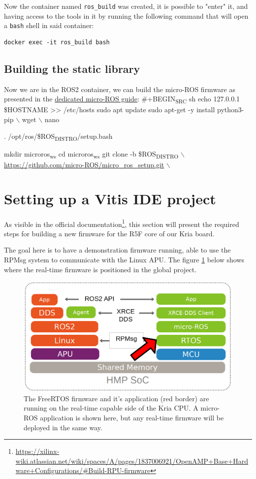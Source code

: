 \documentclass[10pt]{article}
\begin{document}
Now the container named \texttt{ros\_build} was created, it is possible to "enter" it, and having access
to the tools in it by running the following command that will open a \texttt{bash} shell in said container:
\begin{verbatim}
docker exec -it ros_build bash
\end{verbatim}

\subsection{Building the static library}
\label{sec:org9461c53}
Now we are in the ROS2 container, we can build the micro-ROS firmware as presented
in the \href{https://micro.ros.org/docs/tutorials/advanced/create\\\_custom\\\_static\\\_library}{dedicated micro-ROS guide}:
\#+BEGIN\textsubscript{SRC} sh
echo 127.0.0.1 \$HOSTNAME >> /etc/hosts
sudo apt update 
sudo apt-get -y install python3-pip $\backslash$
     wget $\backslash$
     nano

. /opt/ros/\$ROS\textsubscript{DISTRO}/setup.bash

mkdir microros\textsubscript{ws}
cd microros\textsubscript{ws}
git clone -b \$ROS\textsubscript{DISTRO} $\backslash$
    \url{https://github.com/micro-ROS/micro\_ros\_setup.git} $\backslash$
\clearpage
\section{Setting up a Vitis IDE project}
\label{sec:org0db0d05}
As visible in the official documentation\footnote{\url{https://xilinx-wiki.atlassian.net/wiki/spaces/A/pages/1837006921/OpenAMP+Base+Hardware+Configurations/\#Build-RPU-firmware}}, this section will present the required
steps for building a new firmware for the R5F core of our Kria board.

The goal here is to have a demonstration firmware running,
able to use the RPMsg system to communicate with the Linux APU.
The figure \ref{fig:orgeba369e} below shows where the real-time firmware
is positioned in the global project.

\begin{figure}[htbp]
\centering
\includegraphics[width=.6\textwidth]{./img/map_microros.png}
\caption{\label{fig:orgeba369e}The FreeRTOS firmware and it's application (red border) are running on the real-time capable side of the Kria CPU. A micro-ROS application is shown here, but any real-time firmware will be deployed in the same way.}
\end{figure}
\end{document}
